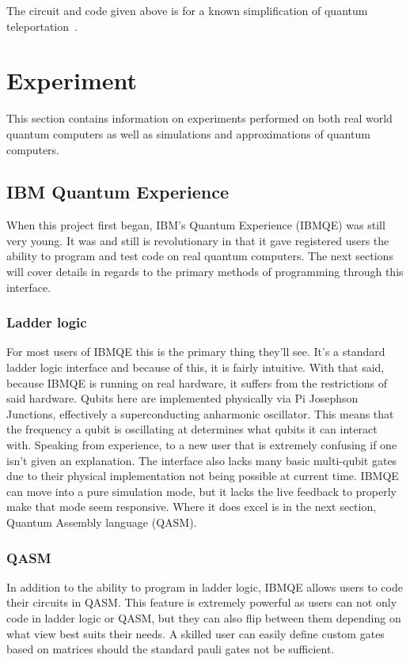\documentclass[a4paper]{article}
\begin{document}
The circuit and code given above is for a known simplification of quantum teleportation~\cite{nielsonChuangQCQI}.



\section{Experiment} %
This section contains information on experiments performed on both real world quantum computers as well as simulations and approximations of quantum computers.


\subsection{IBM Quantum Experience}
When this project first began, IBM's Quantum Experience (IBMQE) was still very young.  It was and still is revolutionary in that it gave registered users the ability to program and test code on real quantum computers.  The next sections will cover details in regards to the primary methods of programming through this interface.
\subsubsection{Ladder logic} %
For most users of IBMQE this is the primary thing they'll see.  It's a standard ladder logic interface and because of this, it is fairly intuitive.  With that said, because IBMQE is running on real hardware, it suffers from the restrictions of said hardware.  Qubits here are implemented physically via Pi Josephson Junctions, effectively a superconducting anharmonic oscillator.  This means that the frequency a qubit is oscillating at determines what qubits it can interact with.  Speaking from experience, to a new user that is extremely confusing if one isn't given an explanation.  The interface also lacks many basic multi-qubit gates due to their physical implementation not being possible at current time.\newline
\newline
IBMQE can move into a pure simulation mode, but it lacks the live feedback to properly make that mode seem responsive.  Where it does excel is in the next section, Quantum Assembly language (QASM).
\subsubsection{QASM} %
In addition to the ability to program in ladder logic, IBMQE allows users to code their circuits in QASM.  This feature is extremely powerful as users can not only code in ladder logic or QASM, but they can also flip between them depending on what view best suits their needs.  A skilled user can easily define custom gates based on matrices should the standard pauli gates not be sufficient.  
\end{document}
